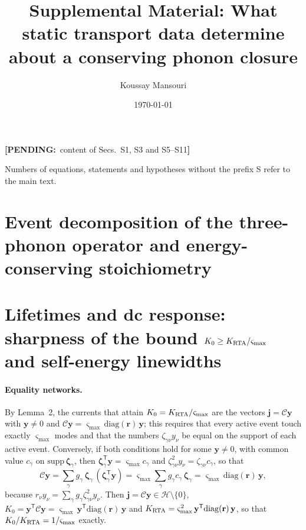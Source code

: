\documentclass[aps,prb,10pt,onecolumn,amsmath,amssymb,superscriptaddress,nofootinbib]{revtex4-2}
\newcommand{\PENDING}[1]{{\color{red}\textbf{[PENDING:}~#1\textbf{]}}}
\theoremstyle{plain}
\newcommand{\tr}{^{\mathsf T}}
\newcommand{\Cop}{\mathcal C}
\newcommand{\Hsp}{\mathcal H}
\newcommand{\jj}{\mathbf j}
\newcommand{\yy}{\mathbf y}
\begin{document}
\title{Supplemental Material: What static transport data determine about a conserving phonon closure}
\author{Koussay Mansouri}
\date{\today}
\maketitle

\PENDING{content of Secs.~S1, S3 and S5--S11}

Numbers of equations, statements and hypotheses without the prefix S refer to the main text.

\section{Event decomposition of the three-phonon operator and energy-conserving stoichiometry}

\section{Lifetimes and dc response: sharpness of the bound $K_0\ge K_{\rm RTA}/\varsigma_{\max}$ and self-energy linewidths}

\paragraph*{Equality networks.}
By Lemma~2, the currents that attain $K_0=K_{\rm RTA}/\varsigma_{\max}$ are the vectors $\jj=\Cop\yy$ with
$\yy\ne0$ and $\Cop\yy=\varsigma_{\max}\,\mathrm{diag}(\mathbf r)\,\yy$; this requires that every active
event touch exactly $\varsigma_{\max}$ modes and that the numbers $\zeta_{\gamma\nu}y_\nu$ be equal on the
support of each active event. Conversely, if both conditions hold for some $\yy\ne0$, with common value
$c_\gamma$ on $\mathrm{supp}\,\bm\zeta_\gamma$, then $\bm\zeta_\gamma\tr\yy=\varsigma_{\max}c_\gamma$ and
$\zeta_{\gamma\nu}^2y_\nu=\zeta_{\gamma\nu}c_\gamma$, so that
\begin{equation}
\Cop\yy=\sum_\gamma g_\gamma\,\bm\zeta_\gamma\,(\bm\zeta_\gamma\tr\yy)
=\varsigma_{\max}\sum_\gamma g_\gamma c_\gamma\,\bm\zeta_\gamma
=\varsigma_{\max}\,\mathrm{diag}(\mathbf r)\,\yy ,
\label{eq:Seq}
\end{equation}
because $r_\nu y_\nu=\sum_\gamma g_\gamma\zeta_{\gamma\nu}^2y_\nu$. Then $\jj=\Cop\yy\in\Hsp\setminus\{0\}$,
$K_0=\yy\tr\Cop\yy=\varsigma_{\max}\,\yy\tr\mathrm{diag}(\mathbf r)\,\yy$ and
$K_{\rm RTA}=\varsigma_{\max}^2\,\yy\tr\mathrm{diag}(\mathbf r)\,\yy$, so that $K_0/K_{\rm RTA}=1/\varsigma_{\max}$
exactly.
\end{document}
